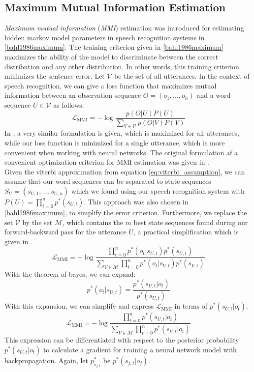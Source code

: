 \subsection{Maximum Mutual Information Estimation}
\label{sec:mmie}
\textit{Maximum mutual information} (\textit{MMI}) estimation was introduced for estimating hidden markov model parameters in speech recognition systems in \ref{bahl1986maximum}. The training criterion given in \ref{bahl1986maximum} maximizes the ability of the model to discriminate between the correct distribution and any other distribution. In other words, this training criterion minimizes the sentence error. Let $\mathcal{V}$ be the set of all utterances. In the context of speech recognition, we can give a loss function that maximizes mutual information between an observation sequence $O = (o_1, ..., o_n)$ and a word sequence $U \in \mathcal{V}$ as follows:
\[
\mathcal{L}_{\text{MMI}} = -\log\frac{p(O|U)P(U)}{\sum_{V \in \mathcal{V}} p(O|V)P(V)} 
\]
In \cite{ghoshal2013sequence}, a very similar formulation is given, which is maximized for all utterances, while our loss function is minimized for a single utterance, which is more convenient when working with neural networks. The original formulation af a convenient optimization criterion for MMI estimation was given in \cite{schluter1998comparison}.\\
Given the viterbi approximation from equation \ref{eq:viterbi_assumption}, we can assume that our word sequences can be separated to state sequences $S_U = (s_{U,1},...,s_{U,n})$ which we found using our speech recognition system with $P(U) = \prod_{t = 0}^{n} p^*(s_{U,t})$. This approach was also chosen in \ref{bahl1986maximum}, to simplify the error criterion. Furthermore, we replace the set $\mathcal{V}$ by the set $\mathcal{M}$, which contains the $m$ best state sequences found during our forward-backward pass for the utterance $U$, a practical simplification which is given in \cite{schluter1998comparison}.
\[
\mathcal{L}_{\text{MMI}} = -\log\frac{\prod_{t = 0}^{n} p^*(o_{t}|s_{U,t})p^*(s_{U,t})}{\sum_{V \in \mathcal{M}} \prod_{t = 0}^{n} p^*(o_{t}|s_{V,t})p^*(s_{V,t})} 
\]
With the theorem of bayes, we can expand:
\[
p^*(o_{t}|s_{U,t}) = \frac{p^*(s_{U,t}|o_{t})}{p^*(s_{U,t})}
\]
With this expansion, we can simplify and express $\mathcal{L}_{\text{MMI}}$ in terms of $p^*(s_{U,t}|o_{t})$.
\[
\mathcal{L}_{\text{MMI}} = -\log\frac{\prod_{t = 0}^{n} p^*(s_{U,t}|o_{t})}{\sum_{V \in \mathcal{M}} \prod_{t = 0}^{n} p^*(s_{V,t}|o_{t})} 
\]
This expression can be differentiated with respect to the posterior probability $p^*(s_{U,t}|o_{t})$ to calculate a gradient for training a neural network model with backpropagation. Again, let $p^*_{s_{j,t}}$ be $p^*(s_{j,t}|o_j)$.
